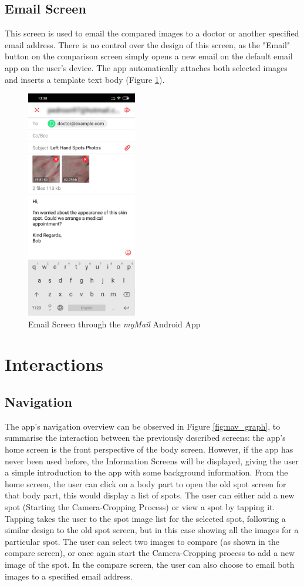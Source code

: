 \subsection{Email Screen}
This screen is used to email the compared images to a doctor or another specified email address. There is no control over the design of this screen, as the "Email" button on the comparison screen simply opens a new email on the default email app on the user's device. The app automatically attaches both selected images and inserts a template text body (Figure \ref{fig:emailscreen}). 

\begin{figure}
    \includegraphics[height=10cm, center]{figures/email_android.jpg}
    \caption{Email Screen through the \emph{myMail} Android App}
    \label{fig:emailscreen}
\end{figure}

\section{Interactions}
\subsection{Navigation}
The app's navigation overview can be observed in Figure \ref{fig:nav_graph}, to summarise the interaction between the previously described screens: the app's home screen is the front perspective of the body screen. However, if the app has never been used before, the Information Screens will be displayed, giving the user a simple introduction to the app with some background information. From the home screen, the user can click on a body part to open the old spot screen for that body part, this would display a list of spots. The user can either add a new spot (Starting the Camera-Cropping Process) or view a spot by tapping it. Tapping takes the user to the spot image list for the selected spot, following a similar design to the old spot screen, but in this case showing all the images for a particular spot. The user can select two images to compare (as shown in the compare screen), or once again start the Camera-Cropping process to add a new image of the spot. In the compare screen, the user can also choose to email both images to a specified email address.

